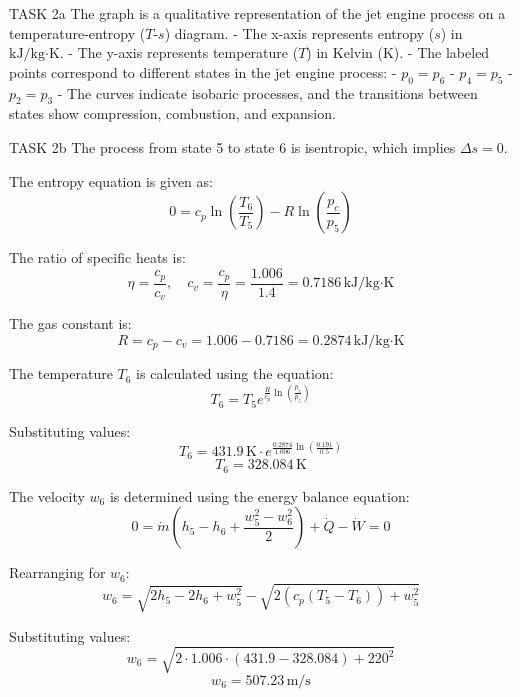 TASK 2a  
The graph is a qualitative representation of the jet engine process on a temperature-entropy (\( T \)-\( s \)) diagram.  
- The x-axis represents entropy (\( s \)) in \( \text{kJ}/\text{kg·K} \).  
- The y-axis represents temperature (\( T \)) in Kelvin (\( \text{K} \)).  
- The labeled points correspond to different states in the jet engine process:  
  - \( p_0 = p_6 \)  
  - \( p_4 = p_5 \)  
  - \( p_2 = p_3 \)  
- The curves indicate isobaric processes, and the transitions between states show compression, combustion, and expansion.  

TASK 2b  
The process from state 5 to state 6 is isentropic, which implies \( \Delta s = 0 \).  

The entropy equation is given as:  
\[
0 = c_p \ln\left(\frac{T_6}{T_5}\right) - R \ln\left(\frac{p_c}{p_5}\right)
\]  

The ratio of specific heats is:  
\[
\eta = \frac{c_p}{c_v}, \quad c_v = \frac{c_p}{\eta} = \frac{1.006}{1.4} = 0.7186 \, \text{kJ}/\text{kg·K}
\]  

The gas constant is:  
\[
R = c_p - c_v = 1.006 - 0.7186 = 0.2874 \, \text{kJ}/\text{kg·K}
\]  

The temperature \( T_6 \) is calculated using the equation:  
\[
T_6 = T_5 e^{\frac{R}{c_p} \ln\left(\frac{p_c}{p_5}\right)}
\]  

Substituting values:  
\[
T_6 = 431.9 \, \text{K} \cdot e^{\frac{0.2874}{1.006} \ln\left(\frac{0.191}{0.5}\right)}  
\]  
\[
T_6 = 328.084 \, \text{K}
\]  

The velocity \( w_6 \) is determined using the energy balance equation:  
\[
0 = \dot{m} \left(h_5 - h_6 + \frac{w_5^2 - w_6^2}{2}\right) + \dot{Q} - \dot{W} = 0
\]  

Rearranging for \( w_6 \):  
\[
w_6 = \sqrt{2 h_5 - 2 h_6 + w_5^2} - \sqrt{2 \left(c_p (T_5 - T_6)\right) + w_5^2}
\]  

Substituting values:  
\[
w_6 = \sqrt{2 \cdot 1.006 \cdot (431.9 - 328.084) + 220^2}  
\]  
\[
w_6 = 507.23 \, \text{m/s}
\]